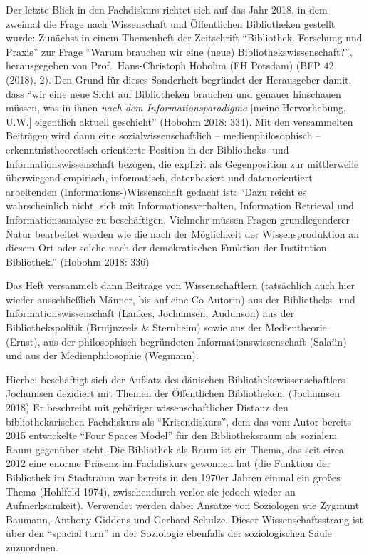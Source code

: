 \documentclass[a4paper,
fontsize=11pt,
oneside,
numbers=noperiodatend,
parskip=half-,
bibliography=totoc,
final
]{scrartcl}
\begin{document}
Der letzte Blick in den Fachdiskurs richtet sich auf das Jahr 2018, in
dem zweimal die Frage nach Wissenschaft und Öffentlichen Bibliotheken
gestellt wurde: Zunächst in einem Themenheft der Zeitschrift
\enquote{Bibliothek. Forschung und Praxis} zur Frage \enquote{Warum
brauchen wir eine (neue) Bibliothekswissenschaft?}, herausgegeben von
Prof.~Hans-Christoph Hobohm (FH Potsdam) (BFP 42 (2018), 2). Den Grund
für dieses Sonderheft begründet der Herausgeber damit, dass \enquote{wir
eine neue Sicht auf Bibliotheken brauchen und genauer hinschauen müssen,
was in ihnen \emph{nach dem Informationsparadigma} {[}meine
Hervorhebung, U.W.{]} eigentlich aktuell geschieht} (Hobohm 2018: 334).
Mit den versammelten Beiträgen wird dann eine sozialwissenschaftlich --
medienphilosophisch -- erkenntnistheoretisch orientierte Position in der
Bibliotheks- und Informationswissenschaft bezogen, die explizit als
Gegenposition zur mittlerweile überwiegend empirisch, informatisch,
datenbasiert und datenorientiert arbeitenden (Informations-)Wissenschaft
gedacht ist: \enquote{Dazu reicht es wahrscheinlich nicht, sich mit
Informationsverhalten, Information Retrieval und Informationsanalyse zu
beschäftigen. Vielmehr müssen Fragen grundlegenderer Natur bearbeitet
werden wie die nach der Möglichkeit der Wissensproduktion an diesem Ort
oder solche nach der demokratischen Funktion der Institution
Bibliothek.} (Hobohm 2018: 336)

Das Heft versammelt dann Beiträge von Wissenschaftlern (tatsächlich auch
hier wieder ausschließlich Männer, bis auf eine Co-Autorin) aus der
Bibliotheks- und Informationswissenschaft (Lankes, Jochumsen, Audunson)
aus der Bibliothekspolitik (Bruijnzeels \& Sternheim) sowie aus der
Medientheorie (Ernst), aus der philosophisch begründeten
Informationswissenschaft (Salaün) und aus der Medienphilosophie
(Wegmann).

Hierbei beschäftigt sich der Aufsatz des dänischen
Bibliothekswissenschaftlers Jochumsen dezidiert mit Themen der
Öffentlichen Bibliotheken. (Jochumsen 2018) Er beschreibt mit gehöriger
wissenschaftlicher Distanz den bibliothekarischen Fachdiskurs als
\enquote{Krisendiskurs}, dem das vom Autor bereits 2015 entwickelte
\enquote{Four Spaces Model} für den Bibliotheksraum als sozialem Raum
gegenüber steht. Die Bibliothek als Raum ist ein Thema, das seit circa
2012 eine enorme Präsenz im Fachdiskurs gewonnen hat (die Funktion der
Bibliothek im Stadtraum war bereits in den 1970er Jahren einmal ein
großes Thema (Hohlfeld 1974), zwischendurch verlor sie jedoch wieder an
Aufmerksamkeit). Verwendet werden dabei Ansätze von Soziologen wie
Zygmunt Baumann, Anthony Giddens und Gerhard Schulze. Dieser
Wissenschaftsstrang ist über den \enquote{spacial turn} in der
Soziologie ebenfalls der soziologischen Säule zuzuordnen.
\end{document}
